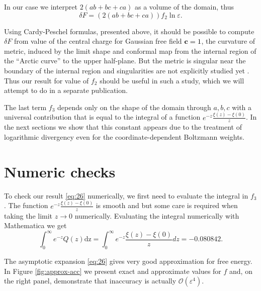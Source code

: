 \documentclass{article}
\newcommand{\dz}{\mathrm{dz}}
\begin{document}
In our case we interpret $2(ab+bc+ca)$ as a volume of the domain, thus
\begin{equation}
  \label{eq:33}
  \delta F = \left(2(ab+bc+ca)\right) f_{2}\ln\varepsilon.
\end{equation}

Using Cardy-Peschel formulas, presented above, it should be possible to compute $\delta F$ from
value of the central charge for Gaussian free field ${\bf c}=1$, the curvature of metric, induced by
the limit shape and conformal map from the internal region of the ``Arctic curve'' to the upper
half-plane.
But the metric is singular near the boundary of the internal region and singularities are not
explicitly studied yet \cite{Astala}. Thus our result for value of $f_2$ should be useful in such a
study, which we will attempt to do in a separate publication.

The last term $f_{3}$ depends only on the shape of the domain through
$a,b,c$ with a universal contribution that is equal to the integral of
a function $e^{-z}\frac{\xi(z)-\xi(0)}{z}$. In the next sections we
show that this constant appears due to the treatment of logarithmic
divergency even for the coordinate-dependent Boltzmann weights. 

\section{Numeric checks}
\label{sec:numeric-checks}
To check our result \eqref{eq:26} numerically, we first need to evaluate the integral in $f_{3}$.
The function $e^{-z}\frac{\xi(z)-\xi(0)}{z}$ is smooth and but some care is required when taking the
limit $z\to 0$ numerically. Evaluating the integral numerically with Mathematica we get
\begin{equation}
  \label{eq:2}
  \int_{0}^{\infty}e^{-z}Q(z)\dz=\int_{0}^{\infty}e^{-z}\frac{\xi(z)-\xi(0)}{z} dz = -0.080842.%
\end{equation}

The asymptotic expansion \eqref{eq:26} gives very good approximation for free energy. In Figure
\ref{fig:approx-acc} we present exact and approximate values for $f$ and, on the right panel,
demonstrate that inaccuracy is actually $\mathcal{O}(\varepsilon^{4})$. 
\end{document}
